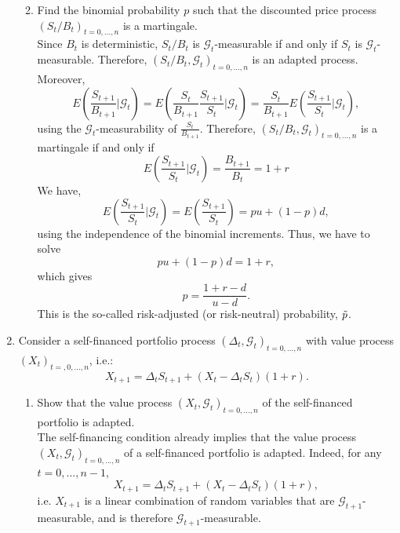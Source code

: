 \documentclass[11pt,a4,table]{article}
\begin{document}
\begin{enumerate}
\begin{enumerate}
\newpage
        \item Find the binomial probability $p$ such that the discounted price process $(S_t/B_t)_{t=0,...,n}$ is a martingale.\\
        Since $B_t$ is deterministic, $S_t/B_t$ is $\mathcal{G}_t$-measurable if and only if $S_t$ is $\mathcal{G}_t$-measurable.
        Therefore, $(S_t/B_t,\mathcal{G}_t)_{t=0,...,n}$ is an adapted process. Moreover,
        \begin{equation*}
            E\left(\frac{S_{t+1}}{B_{t+1}}\bigg\vert\mathcal{G}_t\right) = E\left(\frac{S_t}{B_{t+1}}\frac{S_{t+1}}{S_t}\bigg\vert \mathcal{G}_t\right) = \frac{S_t}{B_{t+1}}E \left(\frac{S_{t+1}}{S_t}\bigg\vert\mathcal{G}_t\right),
        \end{equation*}
        using the $\mathcal{G}_t$-measurability of $\frac{S_t}{B_{t+1}}$. Therefore, $(S_t/B_t, \mathcal{G}_t)_{t=0,...,n}$ is a martingale if and only if
        \begin{equation*}
            E\left(\frac{S_{t+1}}{S_t}\bigg\vert \mathcal{G}_t\right) = \frac{B_{t+1}}{B_t}=1+r
        \end{equation*}
        We have,
        \begin{equation*}
            E\left(\frac{S_{t+1}}{S_t}\bigg\vert\mathcal{G}_t\right) = E\left(\frac{S_{t+1}}{S_t}\right) = pu + (1-p)d,
        \end{equation*}
        using the independence of the binomial increments. Thus, we have to solve
        \begin{equation*}
            pu + (1-p)d = 1+r,
        \end{equation*}
        which gives
        \begin{equation*}
            p = \frac{1+r-d}{u-d}.
        \end{equation*}
        This is the so-called risk-adjusted (or risk-neutral) probability, $\Tilde{p}$.
    \end{enumerate}
    
    
    \item Consider a self-financed portfolio process $(\Delta_t,\mathcal{G}_t)_{t=0,...,n}$ with value process $(X_t)_{t=,0,...,n}$, i.e.:
    \begin{equation*}
        X_{t+1} = \Delta_tS_{t+1} + (X_t-\Delta_t S_t)(1+r).
    \end{equation*}
    
    \begin{enumerate}
        \item Show that the value process $(X_t,\mathcal{G}_t)_{t=0,...,n}$ of the self-financed portfolio is adapted.\\
        The self-financing condition already implies that the value process $(X_t,\mathcal{G}_t)_{t=0,...,n}$ of a self-financed portfolio is adapted. Indeed, for any $t=0,...,n-1$,
        \begin{equation*}
            X_{t+1} = \Delta_tS_{t+1}+(X_t-\Delta_tS_t)(1+r),
        \end{equation*}
        i.e. $X_{t+1}$ is a linear combination of random variables that are $\mathcal{G}_{t+1}$-measurable, and is therefore $\mathcal{G}_{t+1}$-measurable.
        

\end{enumerate}
\end{enumerate}
\end{document}
